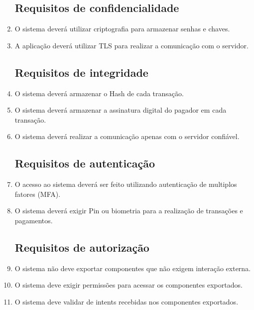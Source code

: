     \begin{enumerate}

    \subsection{Requisitos de confidencialidade}

    \item O sistema deverá utilizar criptografia para armazenar senhas e chaves.
    
    \item A aplicação deverá utilizar TLS para realizar a comunicação com o servidor.
    
    \subsection{Requisitos de integridade}

    \item O sistema deverá armazenar o Hash de cada transação.

    \item O sistema deverá armazenar a assinatura digital do pagador em cada transação.

    \item O sistema deverá realizar a comunicação apenas com o servidor confiável.
    
    \subsection{Requisitos de autenticação}

    \item O acesso ao sistema deverá ser feito utilizando autenticação de multiplos fatores (MFA).

    \item O sistema deverá exigir Pin ou biometria para a realização de transações e pagamentos. 
    
    \subsection{Requisitos de autorização}

    \item O sistema não deve exportar componentes que não exigem interação externa. 

    \item O sistema deve exigir permissões para acessar os componentes exportados. 

    \item O sistema deve validar de intents recebidas nos componentes exportados. 

    \end{enumerate}


